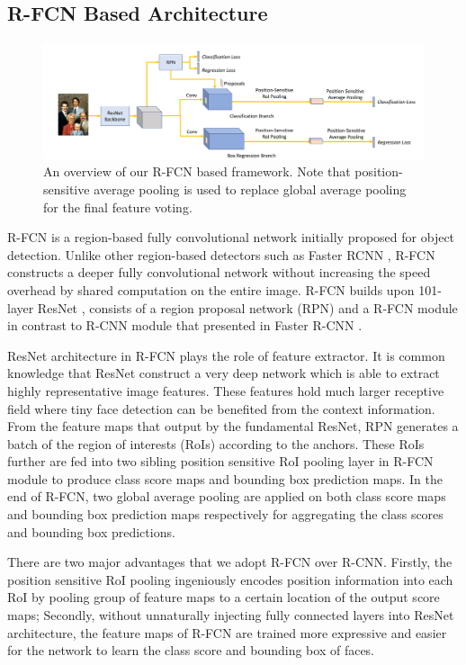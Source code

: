 \documentclass{article} %
\begin{document}
\subsection{R-FCN Based Architecture}

\begin{figure}
  \centering
  \includegraphics[width=13cm, keepaspectratio]{overview_rfcn2.pdf}
  \caption{An overview of our R-FCN based framework. Note that position-sensitive average pooling is used to replace global average pooling for the final feature voting.
    }\label{2}
\end{figure}


R-FCN \cite{RFCN} is a region-based fully convolutional network initially proposed for object detection. Unlike other region-based detectors such as Faster RCNN \cite{FastRCNN}, R-FCN constructs a deeper fully convolutional network without increasing the speed overhead by shared computation on the entire image. R-FCN builds upon 101-layer ResNet \cite{ResNet101}, consists of a region proposal network (RPN) and a R-FCN module in contrast to R-CNN module that presented in Faster R-CNN \cite{FastRCNN}. 

ResNet architecture in R-FCN plays the role of feature extractor. It is common knowledge that ResNet construct a very deep network which is able to extract highly representative image features. These features hold much larger receptive field where tiny face detection can be benefited from the context information. From the feature maps that output by the fundamental ResNet, RPN generates a batch of the region of interests (RoIs) according to the anchors. These RoIs further are fed into two sibling position sensitive RoI pooling layer in R-FCN module to produce class score maps and bounding box prediction maps. In the end of R-FCN, two global average pooling are applied on both class score maps and bounding box prediction maps respectively for aggregating the class scores and bounding box predictions. 

There are two major advantages that we adopt R-FCN over R-CNN. Firstly, the position sensitive RoI pooling ingeniously encodes position information into each RoI by pooling group of feature maps to a certain location of the output score maps; Secondly, without unnaturally injecting fully connected layers into ResNet architecture, the feature maps of R-FCN are trained more expressive and easier for the network to learn the class score and bounding box of faces. 
\end{document}
